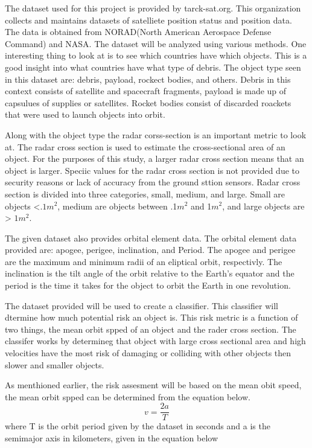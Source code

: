 \documentclass[12pt,a4paper]{article}
\begin{document}
The dataset used for this project is provided by tarck-sat.org. This organization collects and maintains datasets of satelliete position status and position data. The data is obtained from NORAD(North American Aerospace Defense Command) and NASA. The dataset will be analyzed using various methods. One interesting thing to look at is to see which countries have which objects. This is a good insight into what countries have what type of debris. The object type seen in this dataset are: debris, payload, rockect bodies, and others. Debris in this context consists of satellite and spacecraft fragments, payload is made up of capsulues of supplies or satellites. Rocket bodies consist of discarded roackets that were used to launch objects into orbit. 

Along with the object type the radar corss-section is an important metric to look at. The radar cross section is used to estimate the cross-sectional area of an object. For the purposes of this study, a larger radar cross section means that an object is larger. Speciic values for the radar cross section is not provided due to security reasons or lack of accuracy from the ground sttion sensors. Radar cross section is divided into three categories, small, medium, and large. Small are objects <$.1 m^2$, medium are objects between .1$m^2$ and 1$m^2$, and large objects are > $1m^2$.

The given dataset also provides orbital element data. The orbital element data provided are: apogee, perigee, inclination, and Period. The apogee and perigee are the maximum and minimum radii of an eliptical orbit, respectivly. The inclination is the tilt angle of the orbit relative to the Earth's equator and the period is the time it takes for the object to orbit the Earth in one revolution. 

The dataset provided will be used to create a classifier. This classifier will dtermine how much potential risk an object is. This risk metric is a function of two things, the mean orbit spped of an object and the rader cross section. The classifer works by determineg that object with large cross sectional area and high velocities have the most risk of damaging or colliding with other objects then slower and smaller objects.

As menthioned earlier, the risk assesment will be based on the mean obit speed, the mean orbit spped can be determined from the equation below.
\begin{equation}
v = \frac{2a}{T}
\end{equation}
where T is the orbit period given by the dataset in seconds and a is the semimajor axis in kilometers, given in the equation below
\end{document}
